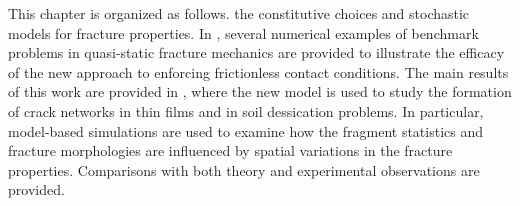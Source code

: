 This chapter is organized as follows.  the constitutive choices and stochastic models for fracture properties.  In , several numerical examples of benchmark problems in quasi-static fracture mechanics are provided to illustrate the efficacy of the new approach to enforcing frictionless contact conditions.  The main results of this work are provided in , where the new model is used to study the formation of crack networks in thin films and in soil dessication problems.  In particular, model-based simulations are used to examine how the fragment statistics and fracture morphologies are influenced by spatial variations in the fracture properties.  Comparisons with both theory and experimental observations are provided.
